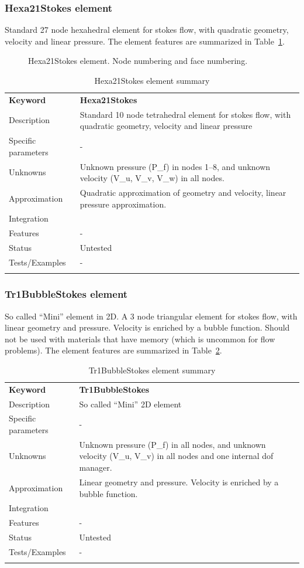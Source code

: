 \documentclass[a4paper]{article}
\newcommand{\param}[1]{\texttt{#1}} %
\newcommand{\templabel}{}%
\newcommand{\tempcaption}{}%
\newcounter{nelpar}
\newenvironment{elementsummary}[5]{%
  \gdef\tempcaption{#4}%
  \gdef\templabel{#5}%
  \setcounter{nelpar}{0}%
  \begin{center} %
    \begin{table}[!htb] %
      \begin{tabular}{|l|p{9cm}|}\hline %
        {\bf Keyword} & \bf{#1}\\ %
        {Description} & {#2}\\ %
        {Specific parameters} & {#3}\\ \hline %
}{
  \\ \hline %
      \end{tabular}%
      \caption{\tempcaption}%
      \label{\templabel}%
    \end{table}%
  \end{center}%
}
\newcommand{\elementParam}[1]{%
  \ifthenelse{\value{nelpar}>0} %
             {&{#1}}%
             {\setcounter{nelpar}{1}Parameters&{#1}}%
             \\%
}
\newcommand{\elementDescription}[2]{{#1} & {#2}\\}
\begin{document}
\subsubsection{Hexa21Stokes element}
Standard 27 node hexahedral element for stokes flow, with quadratic geometry, velocity and linear pressure. The element features are summarized in Table~\ref{Hexa21Stokessummary}.

\begin{figure}[htb]
 \centering
 \begin{makeimage}
  \raisebox{-0.5\height}{}
  \raisebox{-0.5\height}{}
 \end{makeimage}
 \caption{Hexa21Stokes element. Node numbering and face numbering.}
 \label{Hexa21Stokes}
\end{figure}

\begin{elementsummary}{Hexa21Stokes}{Standard 10 node tetrahedral element for stokes flow, with quadratic geometry, velocity and linear pressure}{-}{Hexa21Stokes element summary}{Hexa21Stokessummary}
\elementDescription{Unknowns}{Unknown pressure (P\_f) in nodes 1--8, and unknown velocity (V\_u, V\_v, V\_w) in all nodes.}
\elementDescription{Approximation}{Quadratic approximation of geometry and velocity, linear pressure approximation.}
\elementDescription{Integration}{}
\elementDescription{Features}{-}
\elementDescription{Status}{Untested}
\elementDescription{Tests/Examples}{-}
\end{elementsummary}


\subsubsection{Tr1BubbleStokes element}
So called ``Mini'' element in 2D. A 3 node triangular element for stokes flow, with linear geometry and pressure. Velocity is enriched by a bubble function.
Should not be used with materials that have memory (which is uncommon for flow problems). The element features are summarized in Table~\ref{Tr1BubbleStokessummary}.

\begin{elementsummary}{Tr1BubbleStokes}{So called ``Mini'' 2D element}{-}{Tr1BubbleStokes element summary}{Tr1BubbleStokessummary}
\elementDescription{Unknowns}{Unknown pressure (P\_f) in all nodes, and unknown velocity (V\_u, V\_v) in all nodes and one internal dof manager.}
\elementDescription{Approximation}{Linear geometry and pressure. Velocity is enriched by a bubble function.}
\elementDescription{Integration}{}
\elementDescription{Features}{-}
\elementDescription{Status}{Untested}
\elementDescription{Tests/Examples}{-}
\end{elementsummary}
\end{document}
